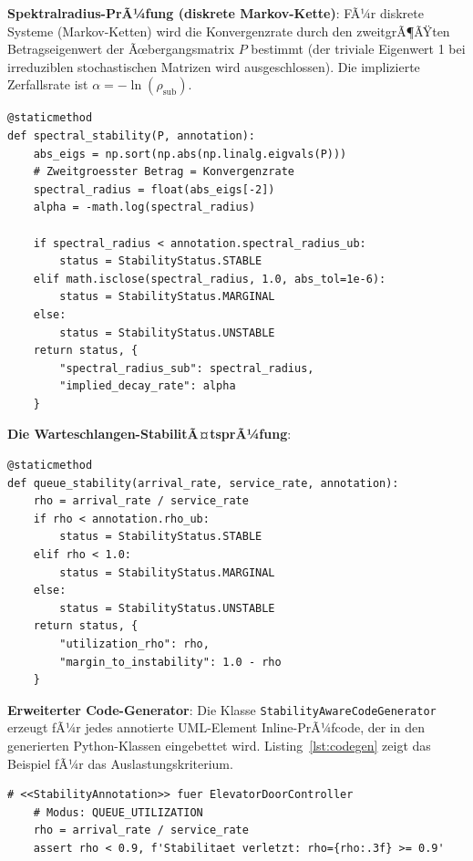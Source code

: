 ﻿\documentclass[a4paper,12pt]{scrreprt}
\theoremstyle{definition}
\begin{document}
\textbf{Spektralradius-PrÃ¼fung (diskrete Markov-Kette)}:
FÃ¼r diskrete Systeme (Markov-Ketten) wird die Konvergenzrate durch den
zweitgrÃ¶ÃŸten Betragseigenwert der Ãœbergangsmatrix $P$ bestimmt
(der triviale Eigenwert 1 bei irreduziblen stochastischen Matrizen wird
ausgeschlossen). Die implizierte Zerfallsrate ist
$\alpha = -\ln(\rho_{\text{sub}})$.

\begin{lstlisting}[style=python,
	caption={Spektralradius-StabilitÃ¤tsprÃ¼fung fÃ¼r Markov-Ketten},
	label={lst:spectral}]
@staticmethod
def spectral_stability(P, annotation):
	abs_eigs = np.sort(np.abs(np.linalg.eigvals(P)))
	# Zweitgroesster Betrag = Konvergenzrate
	spectral_radius = float(abs_eigs[-2])
	alpha = -math.log(spectral_radius)
	
	if spectral_radius < annotation.spectral_radius_ub:
		status = StabilityStatus.STABLE
	elif math.isclose(spectral_radius, 1.0, abs_tol=1e-6):
		status = StabilityStatus.MARGINAL
	else:
		status = StabilityStatus.UNSTABLE
	return status, {
		"spectral_radius_sub": spectral_radius,
		"implied_decay_rate": alpha
	}
\end{lstlisting}

\textbf{Die Warteschlangen-StabilitÃ¤tsprÃ¼fung}:
\begin{lstlisting}[style=python,
	caption={AuslastungsprÃ¼fung fÃ¼r M/M/1-Warteschlangen},
	label={lst:queue}]
@staticmethod
def queue_stability(arrival_rate, service_rate, annotation):
	rho = arrival_rate / service_rate
	if rho < annotation.rho_ub:
		status = StabilityStatus.STABLE
	elif rho < 1.0:
		status = StabilityStatus.MARGINAL
	else:
		status = StabilityStatus.UNSTABLE
	return status, {
		"utilization_rho": rho,
		"margin_to_instability": 1.0 - rho
	}
\end{lstlisting}

\textbf{Erweiterter Code-Generator}:
Die Klasse \texttt{StabilityAwareCodeGenerator} erzeugt fÃ¼r jedes annotierte
UML-Element Inline-PrÃ¼fcode, der in den generierten Python-Klassen
eingebettet wird. Listing~\ref{lst:codegen} zeigt das Beispiel fÃ¼r das
Auslastungskriterium.

\begin{lstlisting}[style=python,
	caption={Generierter StabilitÃ¤ts-Check-Code (Auslastungsmodus)},
	label={lst:codegen}]
	# <<StabilityAnnotation>> fuer ElevatorDoorController
	# Modus: QUEUE_UTILIZATION
	rho = arrival_rate / service_rate
	assert rho < 0.9, f'Stabilitaet verletzt: rho={rho:.3f} >= 0.9'
\end{lstlisting}
\end{document}
